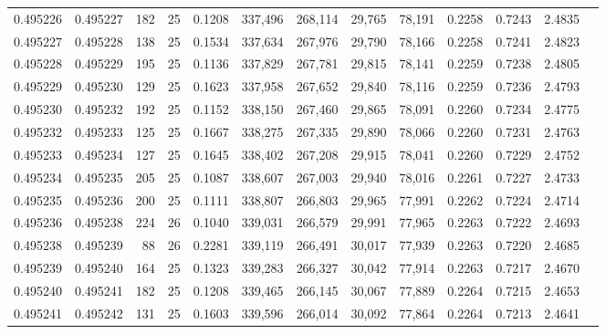 \begin{tabular}{rrrrrrrrrrrrr}
0.495226 & 0.495227 &   182 &  25 &                                     0.1208 & 337,496 & 268,114 &  29,765 &  78,191 & 0.2258 & 0.7243 & 2.4835 \\
0.495227 & 0.495228 &   138 &  25 &                                     0.1534 & 337,634 & 267,976 &  29,790 &  78,166 & 0.2258 & 0.7241 & 2.4823 \\
0.495228 & 0.495229 &   195 &  25 &                                     0.1136 & 337,829 & 267,781 &  29,815 &  78,141 & 0.2259 & 0.7238 & 2.4805 \\
0.495229 & 0.495230 &   129 &  25 &                                     0.1623 & 337,958 & 267,652 &  29,840 &  78,116 & 0.2259 & 0.7236 & 2.4793 \\
0.495230 & 0.495232 &   192 &  25 &                                     0.1152 & 338,150 & 267,460 &  29,865 &  78,091 & 0.2260 & 0.7234 & 2.4775 \\
0.495232 & 0.495233 &   125 &  25 &                                     0.1667 & 338,275 & 267,335 &  29,890 &  78,066 & 0.2260 & 0.7231 & 2.4763 \\
0.495233 & 0.495234 &   127 &  25 &                                     0.1645 & 338,402 & 267,208 &  29,915 &  78,041 & 0.2260 & 0.7229 & 2.4752 \\
0.495234 & 0.495235 &   205 &  25 &                                     0.1087 & 338,607 & 267,003 &  29,940 &  78,016 & 0.2261 & 0.7227 & 2.4733 \\
0.495235 & 0.495236 &   200 &  25 &                                     0.1111 & 338,807 & 266,803 &  29,965 &  77,991 & 0.2262 & 0.7224 & 2.4714 \\
0.495236 & 0.495238 &   224 &  26 &                                     0.1040 & 339,031 & 266,579 &  29,991 &  77,965 & 0.2263 & 0.7222 & 2.4693 \\
0.495238 & 0.495239 &    88 &  26 &                                     0.2281 & 339,119 & 266,491 &  30,017 &  77,939 & 0.2263 & 0.7220 & 2.4685 \\
0.495239 & 0.495240 &   164 &  25 &                                     0.1323 & 339,283 & 266,327 &  30,042 &  77,914 & 0.2263 & 0.7217 & 2.4670 \\
0.495240 & 0.495241 &   182 &  25 &                                     0.1208 & 339,465 & 266,145 &  30,067 &  77,889 & 0.2264 & 0.7215 & 2.4653 \\
0.495241 & 0.495242 &   131 &  25 &                                     0.1603 & 339,596 & 266,014 &  30,092 &  77,864 & 0.2264 & 0.7213 & 2.4641 \\

\end{tabular}
